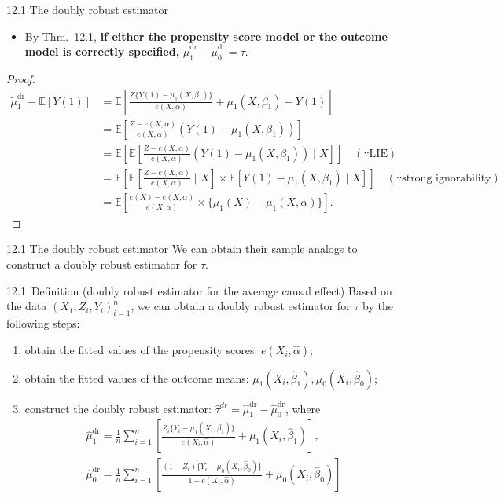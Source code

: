 \documentclass[aspectratio=169, 12pt]{beamer}
\newcommand{\E}{\mathbb{E}}
\begin{document}
\begin{frame}{12.1 The doubly robust estimator}
  \begin{itemize}
    \item By Thm.~12.1, \textbf{if either the propensity score model or the outcome model is correctly specified,} $\tilde{\mu}_1^{\text{dr}} - \tilde{\mu}_0^{\text{dr}} = \tau.$
  \end{itemize}
  \small
  \begin{proof}
  \vspace{-3mm}
    \begin{align*}
      \tilde{\mu}_1^{\text{dr}} - \E[Y(1)]
      &= \E\left[\frac{Z\{Y(1)-\mu_1(X,\beta_1)\}}{e(X,\alpha)}+\mu_1(X,\beta_1) - Y(1)\right]\\
      &= \E\left[\frac{Z-e(X,\alpha)}{e(X,\alpha)}(Y(1)-\mu_1(X,\beta_1))\right]\\
      &= \E\left[\E\left[\frac{Z-e(X,\alpha)}{e(X,\alpha)}(Y(1)-\mu_1(X,\beta_1))\mid X\right]\right]\quad (\because \text{LIE})\\
      &= \E\left[\E\left[\frac{Z-e(X,\alpha)}{e(X,\alpha)}\mid X\right]\times \E\left[Y(1)-\mu_1(X,\beta_1)\mid X\right]\right]\quad (\because\text{strong ignorability})\\
      &= \E\left[\frac{e(X)-e(X,\alpha)}{e(X,\alpha)}\times \{\mu_1(X)-\mu_1(X,\alpha)\}\right].
    \end{align*}
  \end{proof}
\end{frame}

\begin{frame}{12.1 The doubly robust estimator}
  We can obtain their sample analogs to construct a doubly robust estimator for $\tau$.
  
  \begin{keybox}{12.1~Definition (doubly robust estimator for the average causal effect)}
    Based on the data $(X_1,Z_i,Y_i)_{i=1}^n$, we can obtain a doubly robust estimator for $\tau$ by the following steps:
    \begin{enumerate}
      \item obtain the fitted values of the propensity scores: $e(X_i,\hat{\alpha})$;
      \item obtain the fitted values of the outcome means: $\mu_1(X_i,\hat{\beta}_1),\mu_0(X_i,\hat{\beta}_0)$;
      \item construct the doubly robust estimator: $\hat{\tau}^{dr}=\hat{\mu}_1^{\text{dr}}-\hat{\mu}_0^{\text{dr}}$, where
      \begin{gather*}
        \hat{\mu}_1^{\text{dr}} = \frac{1}{n}\sum_{i=1}^{n}\left[\frac{Z_i\{Y_i-\mu_1(X_i,\hat{\beta}_1)\}}{e(X_i,\hat{\alpha})} + \mu_1(X_i,\hat{\beta}_1)\right],\\
        \hat{\mu}_0^{\text{dr}} = \frac{1}{n}\sum_{i=1}^{n}\left[\frac{(1-Z_i)\{Y_i-\mu_0(X_i,\hat{\beta}_0)\}}{1-e(X_i,\hat{\alpha})} + \mu_0(X_i,\hat{\beta}_0)\right]
      \end{gather*}
    \end{enumerate}
  \end{keybox}
\end{frame}
\end{document}
